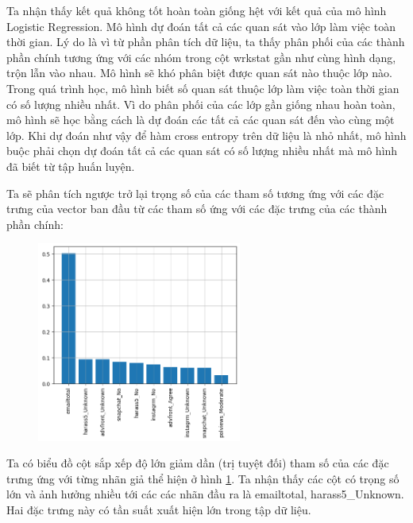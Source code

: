\begin{enumerate}[label=(\alph*)]
    Ta nhận thấy kết quả không tốt hoàn toàn giống hệt với kết quả của mô hình Logistic Regression.
    Mô hình dự đoán tất cả các quan sát vào lớp làm việc toàn thời gian.
    Lý do là vì từ phần phân tích dữ liệu, ta thấy phân phối của các thành phần chính tương ứng với các nhóm trong cột wrkstat gần như cùng hình dạng, trộn lẫn vào nhau.
    Mô hình sẽ khó phân biệt được quan sát nào thuộc lớp nào.
    Trong quá trình học, mô hình biết số quan sát thuộc lớp làm việc toàn thời gian có số lượng nhiều nhất.
    Vì do phân phối của các lớp gần giống nhau hoàn toàn, mô hình sẽ học bằng cách là dự đoán các tất cả các quan sát đến vào cùng một lớp.
    Khi dự đoán như vậy để hàm cross entropy trên dữ liệu là nhỏ nhất, mô hình buộc phải chọn dự đoán tất cả các quan sát có số lượng nhiều nhất mà mô hình đã biết từ tập huấn luyện.

    Ta sẽ phân tích ngược trở lại trọng số của các tham số tương ứng với các đặc trưng của vector ban đầu từ các tham số ứng với các đặc trưng của các thành phần chính:

    \begin{figure}[H]
        \centering
        \includegraphics[width=0.6\textwidth]{figures/Thanh/Models/Random_Forest/Non_null_models_Feature_Importance_Random_Forest_PCA_features.png}
        \caption{}
        \label{fig:Non_null_models_Feature_Importance_Random_Forest_PCA_features}
    \end{figure}
    
    Ta có biểu đồ cột sắp xếp độ lớn giảm dần (trị tuyệt đối) tham số của các đặc trưng ứng với từng nhãn giả thể hiện ở hình \ref{fig:Non_null_models_Feature_Importance_Random_Forest_PCA_features}.
    Ta nhận thấy các cột có trọng số lớn và ảnh hưởng nhiều tới các các nhãn đầu ra là emailtotal, harass5\_Unknown.
    Hai đặc trưng này có tần suất xuất hiện lớn trong tập dữ liệu.


\end{enumerate}
